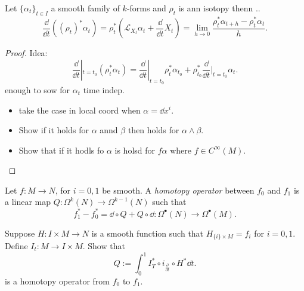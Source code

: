 \begin{proposition}
	Let $\{\alpha_t\} _{t \in I}$ a smooth family of $k$-forms and $\rho_t$ is ann isotopy thenn .. \[
		\frac{\dd}{\dd t} \left( (\rho_t)^{*}\alpha_t\right) = \rho^*_t\left(\mathcal{L} _{X_t} \alpha_t + \frac{\dd}{ \dd t}X_t\right) = \lim_{h \to 0} \frac{\rho_t^* \alpha_{t + h}- \rho^*_t \alpha_t}{h}
	.\] 
\end{proposition}
\begin{proof}
	Idea:
\[
	\frac{\dd }{\dd t}|_{t = t_0}(\rho^*_t \alpha_t) = \frac{\dd }{\dd t}|_{t = t_0} \rho^*_t \alpha_{t_0} + \rho^*_{t_0} \frac{\dd }{\dd t}|_{t = t_0} \alpha _t
.\] 	
enough to sow for $\alpha_t$ time indep.
\begin{itemize}
	\item take the case in local coord when $\alpha = \dd x^{i}$. 
	\item Show if it holds for $\alpha$ annd $\beta$ then holds for $\alpha \wedge \beta$.
	\item Show that if it hodls fo $\alpha$ is holsd for $f \alpha$ where $f \in C^{\infty}(M)$.
\end{itemize}
\end{proof}
\begin{definition}
	Let $f: M \to N$, for $i = 0, 1$ be smooth. 
	A \emph{homotopy operator} between $f_0$ and $f_1$ is a linear map $Q: \Omega^{k}(N) \to \Omega ^{k-1}(N)$ such that  \[
		f_1^{*} - f_0^* = \dd \circ Q + Q \circ \dd : \Omega^\bullet (N) \to \Omega^{\bullet}(M)
	.\] 
\end{definition}
\begin{exercise}
	Suppose $H: I \times  M \to N$ is a smooth function such that $H_{\{i\} \times  M } = f_i$ for $i = 0,1$. 
	Define $I_t: M \to I \times M$.
	Show that \[
Q:= \int_0^{1}I_T^{*}\circ i_{\frac{\partial }{\partial t} } \circ H^* \dd t	
	.\] 
	is a homotopy operator from $f_0 $ to $f_1$.
\end{exercise}

